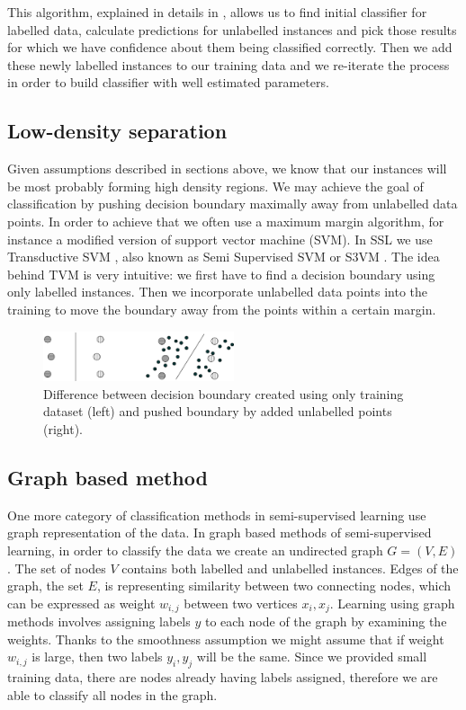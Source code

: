 \documentclass[12pt, a4paper, pdflatex]{report}
\begin{document}
This algorithm, explained in details in \cite{chapelle06}, allows us to find initial classifier for labelled data, calculate predictions for unlabelled instances and pick those results for which we have confidence about them being classified correctly. Then we add these newly labelled instances to our training data and we re-iterate the process in order to build classifier with well estimated parameters.

\subsection{Low-density separation}

Given assumptions described in sections above, we know that our instances will be most probably forming high density regions. We may achieve the goal of classification by pushing decision boundary maximally away from unlabelled data points.
In order to achieve that we often use a maximum margin algorithm, for instance a modified version of support vector machine (SVM)\cite{chapelle06,Zhu06semi}. In SSL we use Transductive SVM \cite{chapelle06}, also known as Semi Supervised SVM or S3VM \cite{Zhu06semi}.
The idea behind TVM is very intuitive: we first have to find a decision boundary using only labelled instances. Then we incorporate unlabelled data points into the training to move the boundary away from the points within a certain margin.

\begin{figure}[htbp]
\centering
\includegraphics[width=0.5\textwidth]{graphics/s3vm.png}
\caption{ Difference between decision boundary created using only training dataset (left) and pushed boundary by added unlabelled points (right).\label{fig:SvmMethodFig}}
\end{figure}

\subsection{Graph based method}

One more category of classification methods in semi-supervised learning use graph representation of the data. In graph based methods of semi-supervised learning, in order to classify the data we create an undirected graph $ G = (V, E) $. The set of nodes $ V $ contains both labelled and unlabelled instances. Edges of the graph, the set $ E $, is representing similarity between two connecting nodes, which can be expressed as weight $ w_{i,j} $ between two vertices $x_{i}, x_{j} $. Learning using graph methods involves assigning labels $ y $ to each node of the graph by examining the weights. Thanks to the smoothness assumption we might assume that if weight $ w_{i,j} $ is large, then two labels $ y_i, y_j $ will be the same. Since we provided small training data, there are nodes already having labels assigned, therefore we are able to classify all nodes in the graph\cite{Zhu06semi}.
\end{document}
